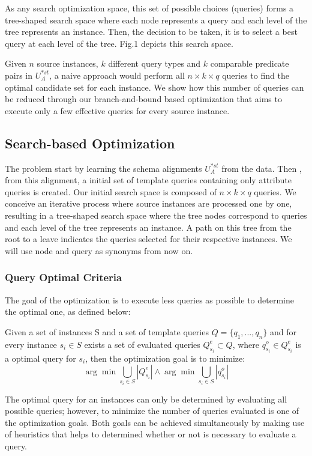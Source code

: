 As any search optimization space, this set of possible choices (queries) forms a tree-shaped search space where each node represents a query and each level of the tree represents an instance. Then, the decision to be taken, it is to select a best query at each level of the tree. Fig.1 depicts this search space.

Given $n$ source instances, $k$ different query types and $k$ comparable predicate pairs in $U^{*st}_A$, a naive approach would perform all $n \times k \times q$ queries to find the optimal candidate set for each instance. We show how this number of queries can be reduced through our branch-and-bound based optimization that aims to execute only a few effective queries for every source instance. 
 
\subsection{Search-based Optimization} 
The problem start by learning the schema alignments $U^{*st}_A$ from the data. Then , from this alignment, a initial set of template queries containing only attribute queries is created. Our initial search space is composed of $n \times k \times q$ queries. We conceive an iterative process where source instances are processed one by one, resulting in a tree-shaped search space where the tree nodes correspond to queries and each level of the tree represents an instance.  A path on this tree from the root to a leave indicates the queries selected for their respective instances. We will use node and query as synonyms from now on.

\subsubsection{Query Optimal Criteria} 

The goal of the optimization is to execute less queries as possible to determine the optimal one, as defined below:
\begin{definition} Given a set of instances S and a set of template queries $Q =\{q_1,..., q_n\}$ and for every instance $s_i \in S$ exists a set of evaluated queries $Q^e_{s_i} \subset Q$, where $q^o_{s_i} \in Q^e_{s_i}$ is a optimal query for $s_i$, then the optimization goal is to minimize:
\[
{\arg \min} \bigcup_{s_i \in S}|Q^e_{s_i}| \land
{\arg \min} \bigcup_{s_i \in S} |q^o_{s_i}| 
\]
\end{definition} 

The optimal query for an instances can only be determined by evaluating all possible queries; however, to minimize the number of queries evaluated is one of the optimization goals. Both goals can be achieved simultaneously by making use of heuristics that helps to determined whether or not is necessary to evaluate a query.


